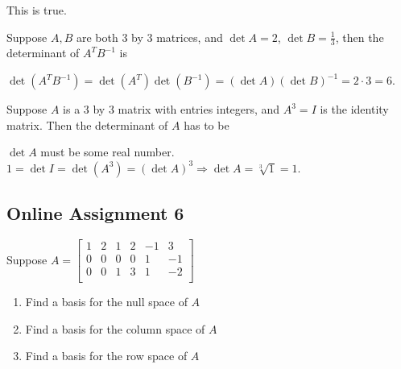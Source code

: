 \documentclass[a4paper,10pt]{article}
\begin{document}
\begin{solution}
This is true.
\end{solution}

\begin{problem}
Suppose $A,B$ are both 3 by 3 matrices, and $\det A=2$, $\det B=\frac{1}{3}$, then the determinant of $A^TB^{-1}$ is
\end{problem}

\begin{solution}
$\det(A^TB^{-1})=\det(A^T)\det(B^{-1})=(\det A)(\det B)^{-1}=2\cdot 3=6$.
\end{solution}

\begin{problem}
Suppose $A$ is a 3 by 3 matrix with entries integers, and $A^3=I$ is the identity matrix. Then the determinant of $A$ has to be
\end{problem}

\begin{solution}
$\det A$ must be some real number. $1=\det I=\det(A^3)=(\det A)^3\Rightarrow \det A=\sqrt[3]{1}=1$.
\end{solution}

\subsection{Online Assignment 6}

\begin{problem}
Suppose $A=\begin{bmatrix}
1&2&1&2&-1&3\\
0&0&0&0&1&-1\\
0&0&1&3&1&-2\\
\end{bmatrix}$
\begin{enumerate}[label=\alph*)]
\item Find a basis for the null space of $A$
\item Find a basis for the column space of $A$
\item Find a basis for the row space of $A$
\end{enumerate}
\end{problem}
\end{document}
